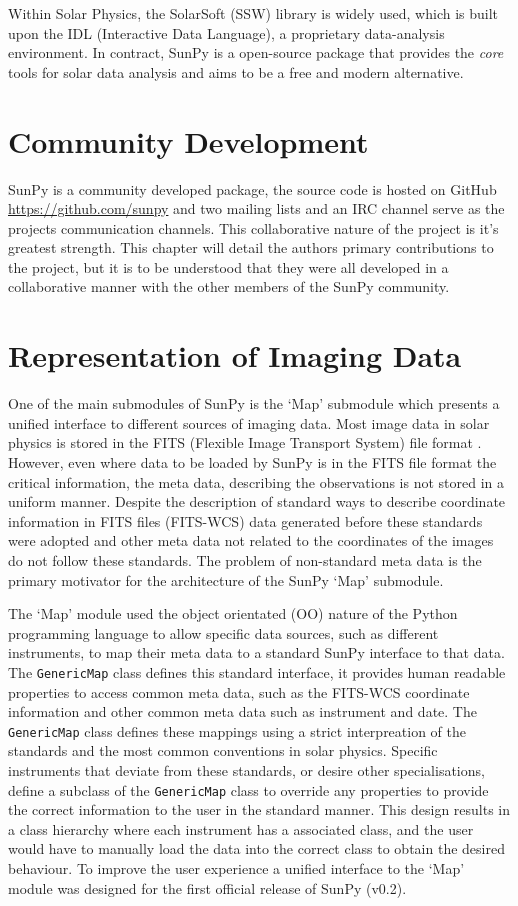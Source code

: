 Within Solar Physics, the SolarSoft (SSW) library \citep{freeland1998} is widely used, which is built upon the IDL (Interactive Data Language), a proprietary data-analysis environment. In contract, SunPy is a open-source package that provides the \textit{core} tools for solar data analysis and aims to be a free and modern alternative.

\section{Community Development}
SunPy is a community developed package, the source code is hosted on GitHub \url{https://github.com/sunpy} and two mailing lists and an IRC channel serve as the projects communication channels.
This collaborative nature of the project is it's greatest strength.
This chapter will detail the authors primary contributions to the project, but it is to be understood that they were all developed in a collaborative manner with the other members of the SunPy community.

\section{Representation of Imaging Data}

One of the main submodules of SunPy is the `Map' submodule which presents a unified interface to different sources of imaging data.
Most image data in solar physics is stored in the FITS (Flexible Image Transport System) file format \cite{pence2010}.
However, even where data to be loaded by SunPy is in the FITS file format the critical information, the meta data, describing the observations is not stored in a uniform manner.
Despite the description of standard ways to describe coordinate information in FITS files (FITS-WCS) \citep{greisen2002,thompson2006} data generated before these standards were adopted and other meta data not related to the coordinates of the images do not follow these standards.
The problem of non-standard meta data is the primary motivator for the architecture of the SunPy `Map' submodule.

The `Map' module used the object orientated (OO) nature of the Python programming language to allow specific data sources, such as different instruments, to map their meta data to a standard SunPy interface to that data.
The \verb|GenericMap| class defines this standard interface, it provides human readable properties to access common meta data, such as the FITS-WCS coordinate information and other common meta data such as instrument and date.
The \verb|GenericMap| class defines these mappings using a strict interpreation of the standards and the most common conventions in solar physics.
Specific instruments that deviate from these standards, or desire other specialisations, define a subclass of the \verb|GenericMap| class to override any properties to provide the correct information to the user in the standard manner.
This design results in a class hierarchy where each instrument has a associated class, and the user would have to manually load the data into the correct class to obtain the desired behaviour.
To improve the user experience a unified interface to the `Map' module was designed for the first official release of SunPy (v0.2).

